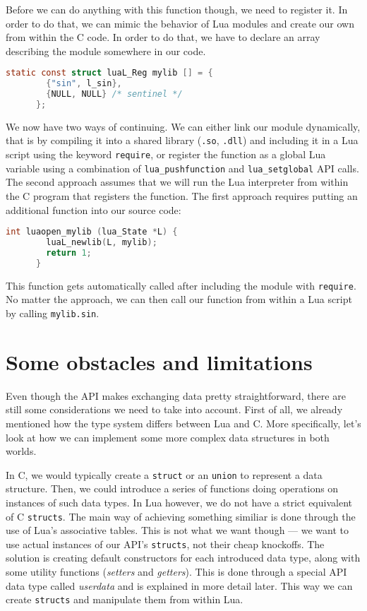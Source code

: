 \documentclass[polish, english]{iithesis}
\begin{document}
    Before we can do anything with this function though, we need to register it.
    In order to do that, we can mimic the behavior of Lua modules and create our own from within the C code.
    In order to do that, we have to declare an array describing the module somewhere in our code.
    \begin{lstlisting}[language=C, caption=Module declaration]
      static const struct luaL_Reg mylib [] = {
        {"sin", l_sin},
        {NULL, NULL} /* sentinel */
      };
    \end{lstlisting}
    We now have two ways of continuing.
    We can either link our module dynamically, that is by compiling it into a shared library (\texttt{.so}, \texttt{.dll}) and including it in a Lua script using the keyword \texttt{require}, or register the function as a global Lua variable using a combination of \texttt{lua\_pushfunction} and \texttt{lua\_setglobal} API calls. 
    The second approach assumes that we will run the Lua interpreter from within the C program that registers the function.
    The first approach requires putting an additional function into our source code:
    \begin{lstlisting}[language=C, caption=The \texttt{luaopen\_mylib} function]
      int luaopen_mylib (lua_State *L) {
        luaL_newlib(L, mylib);
        return 1;
      }
    \end{lstlisting}
    This function gets automatically called after including the module with \texttt{require}.
    No matter the approach, we can then call our function from within a Lua script by calling \texttt{mylib.sin}.
  \section{Some obstacles and limitations}
    Even though the API makes exchanging data pretty straightforward, there are still some considerations we need to take into account.
    First of all, we already mentioned how the type system differs between Lua and C.
    More specifically, let's look at how we can implement some more complex data structures in both worlds.

    In C, we would typically create a \texttt{struct} or an \texttt{union} to represent a data structure.
    Then, we could introduce a series of functions doing operations on instances of such data types.
    In Lua however, we do not have a strict equivalent of C \texttt{structs}.
    The main way of achieving something similiar is done through the use of Lua's associative tables.
    This is not what we want though --- we want to use actual instances of our API's \texttt{structs}, not their cheap knockoffs.
    The solution is creating default constructors for each introduced data type, along with some utility functions (\textit{setters} and \textit{getters}).
    This is done through a special API data type called \textit{userdata} and is explained in more detail later.
    This way we can create \texttt{structs} and manipulate them from within Lua.
\end{document}
